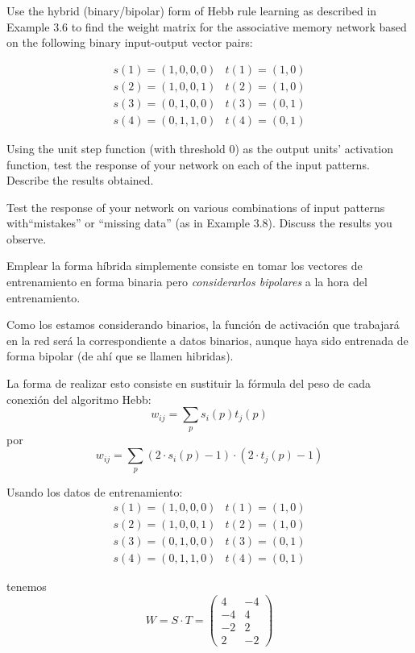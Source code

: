 \begin{problem}[6]
\ppart Use the hybrid (binary/bipolar) form of Hebb rule learning as described in Example
3.6 to find the weight matrix for the associative memory network based on the
following binary input-output vector pairs:

\[\begin{array}{cc}
s(1) = (1,0,0,0) & t(1)=(1,0)\\
s(2) = (1,0,0,1) & t(2) = (1,0)\\
s(3)=(0,1,0,0) & t(3) = (0,1) \\
s(4) = (0,1,1,0) & t(4) = (0,1)
\end{array}\]

\ppart  Using the unit step function (with threshold 0) as the output units' activation function, test the response of your network on each of the input patterns. Describe the results obtained.

\ppart Test the response of your network on various combinations of input patterns with``mistakes'' or ``missing data'' (as in Example 3.8). Discuss the results you observe.

\solution


\spart

Emplear la forma híbrida simplemente consiste en tomar los vectores de entrenamiento en forma binaria pero \emph{considerarlos bipolares} a la hora del entrenamiento.

Como los estamos considerando binarios, la función de activación que trabajará en la red será la correspondiente a datos binarios, aunque haya sido entrenada de forma bipolar (de ahí que se llamen hibridas).

La forma de realizar esto consiste en sustituir la fórmula del peso de cada conexión del algoritmo Hebb:
\[w_{ij} = \sum_p s_i(p)t_j(p)\]
por
\[w_{ij} = \sum_p (2\cdot s_i(p)-1) \cdot (2\cdot t_j(p)-1)\]

Usando los datos de entrenamiento:
\[\begin{array}{cc}
s(1) = (1,0,0,0) & t(1) = (1,0)\\
s(2) = (1,0,0,1) & t(2) = (1,0)\\
s(3)=  (0,1,0,0) & t(3) = (0,1) \\
s(4) = (0,1,1,0) & t(4) = (0,1)
\end{array}\]

tenemos
\[W = S\cdot T = \left( \begin{array}{cc}
4 & -4 \\
-4 & 4 \\
-2 & 2 \\
2 & -2
\end{array}\right)\]


\end{problem}
